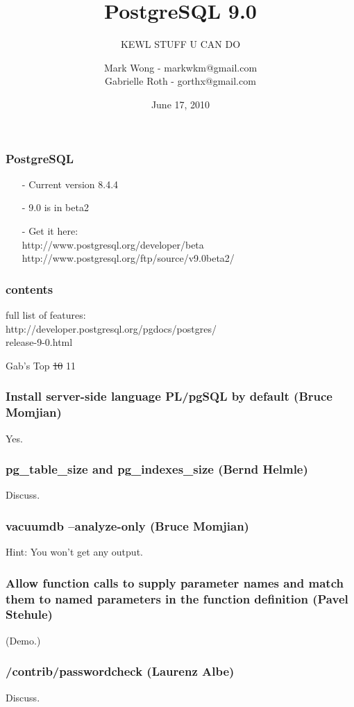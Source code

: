 \documentclass{beamer}
\title{PostgreSQL 9.0}
\subtitle{KEWL STUFF U CAN DO}
\author{Mark Wong - markwkm@gmail.com\\Gabrielle Roth - gorthx@gmail.com}
\institute{PDXPUG}
\date{June 17, 2010}
\begin{document}
\frame{\titlepage}

\frame
{
  \frametitle{PostgreSQL}

  \begin{itemize}
  \item[-] Current version 8.4.4
  \item[-] 9.0 is in beta2
  \item[-] Get it here:\\
  http://www.postgresql.org/developer/beta\\
  http://www.postgresql.org/ftp/source/v9.0beta2/
  \end{itemize}
}

\frame
{
  \frametitle{contents}

  full list of features:\\
  http://developer.postgresql.org/pgdocs/postgres/\\
  release-9-0.html
}

\frame
{
  \begin{center}
  \huge{Gab's Top}
  \sout{10}
  \huge{11}
  \end{center}
}

\frame
{
  \frametitle{Install server-side language PL/pgSQL by default (Bruce Momjian)}
  \begin{center}
  Yes.
  \end{center}
}

\frame
{
  \frametitle{pg\_table\_size and pg\_indexes\_size (Bernd Helmle)}
  \begin{center}
  Discuss.
  \end{center}
}

\frame
{
  \frametitle{vacuumdb --analyze-only (Bruce Momjian)}
  \begin{center}
  Hint:  You won't get any output.
  \end{center}
}

\frame
{
  \frametitle{Allow function calls to supply parameter names and match them to named parameters in the function definition (Pavel Stehule)}

(Demo.)
}

\frame
{
  \frametitle{/contrib/passwordcheck (Laurenz Albe)}
  \begin{center}
  Discuss.
  \end{center}
}
\end{document}

